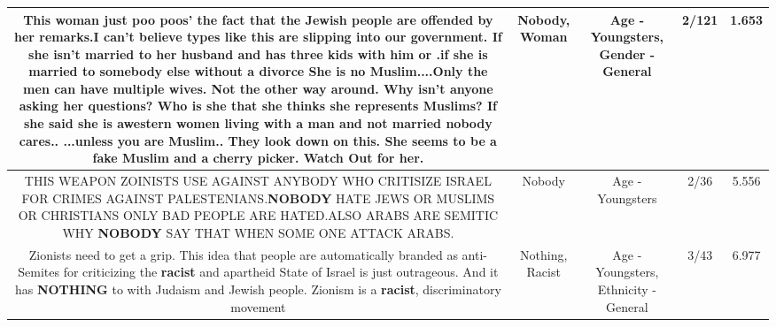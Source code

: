 \documentclass[11pt]{article}
\newlength\mylength
\begin{document}
\begin{center}
\begin{longtable}{|C{.65\mylength}|C{.30\mylength}|C{.12\mylength}|C{.12\mylength}|C{.12\mylength}|}
  \small This \textbf{woman} just poo poos' the fact that the Jewish people are offended by her remarks.I can't believe types like this are slipping into our government.  If she isn't married to her husband and has three kids with him or .if she is married to somebody else without a divorce She is no Muslim....Only the men can have multiple wives.  Not the other way around. Why isn't anyone asking her questions?   Who is she that she thinks she represents Muslims?  If she said she is awestern women living with a man and not married \textbf{nobody} cares.. ...unless you are Muslim.. They look down on this.    She seems to be a fake  Muslim  and a cherry picker.   Watch Out for her.\normalsize   & Nobody, Woman & Age - Youngsters, Gender - General & 2/121 & 1.653 \\  \hline
  \small THIS WEAPON ZOINISTS USE  AGAINST ANYBODY WHO CRITISIZE ISRAEL FOR CRIMES AGAINST PALESTENIANS.\textbf{NOBODY} HATE JEWS OR MUSLIMS OR CHRISTIANS ONLY BAD PEOPLE ARE HATED.ALSO ARABS ARE SEMITIC WHY \textbf{NOBODY} SAY THAT WHEN SOME ONE ATTACK ARABS.\normalsize   & Nobody & Age - Youngsters & 2/36 & 5.556 \\  \hline
  \small Zionists need to get a grip. This idea that people are automatically branded as anti-Semites for criticizing the \textbf{racist} and apartheid State of Israel is just outrageous. And it has \textbf{NOTHING} to with Judaism and Jewish people. Zionism is a \textbf{racist}, discriminatory movement\normalsize   & Nothing, Racist & Age - Youngsters, Ethnicity - General & 3/43 & 6.977 \\  \hline

\end{longtable}
\end{center}
\end{document}
